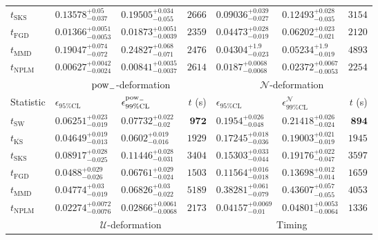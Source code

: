 \begin{tabular}{l|llr|llr}
	$t_{\mathrm{SKS}}$ & $0.13578_{-0.037}^{+0.05}$ & $0.19505_{-0.055}^{+0.034}$ & $2666$ & $0.09036_{-0.027}^{+0.039}$ & $0.12493_{-0.035}^{+0.028}$ & $3154$ \\
	$t_{\mathrm{FGD}}$ & ${\mathbf{0.01366_{-0.0053}^{+0.0051}}}$ & ${\mathbf{0.01873_{-0.0039}^{+0.0051}}}$ & $2359$ & $0.04473_{-0.019}^{+0.028}$ & $0.06202_{-0.021}^{+0.023}$ & $2120$ \\
	$t_{\mathrm{MMD}}$ & $0.19047_{-0.072}^{+0.074}$ & $0.24827_{-0.071}^{+0.068}$ & $2476$ & ${\mathbf{0.04304_{-0.023}^{+1.9}}}$ & ${\mathbf{0.05234_{-0.019}^{+1.9}}}$ & $4893$ \\
\rowcolor{red!35}	$t_{\mathrm{NPLM}}$ & $0.00627_{-0.0024}^{+0.0042}$ & $0.00841_{-0.0037}^{+0.0035}$ & $2614$ & $0.0187_{-0.0068}^{+0.0068}$ & $0.02372_{-0.0053}^{+0.0067}$ & $2254$ \\
	\toprule
	\multicolumn{1}{c}{} & \multicolumn{3}{c}{$\rm{pow}_{-}$-deformation} & \multicolumn{3}{c}{$\mathcal{N}$-deformation} \\
	Statistic & $\epsilon_{95\%\mathrm{CL}}$ & $\epsilon^  {\rm{pow}_{-}}_{99\%\mathrm{CL}}$ & $t$ (s) & $\epsilon_{95\%\mathrm{CL}}$ & $\epsilon^    {\mathcal{N}}_{99\%\mathrm{CL}}$ & $t$ (s) \\
	\midrule
	$t_{\mathrm{SW}}$ & $0.06251_{-0.019}^{+0.023}$ & $0.07732_{-0.02}^{+0.022}$ & ${\mathbf{972}}$ & $0.1954_{-0.048}^{+0.026}$ & $0.21418_{-0.024}^{+0.026}$ & ${\mathbf{894}}$ \\
	$t_{\overline{\mathrm{KS}}}$ & ${\mathbf{0.04649_{-0.013}^{+0.019}}}$ & ${\mathbf{0.0602_{-0.016}^{+0.019}}}$ & $1929$ & $0.17245_{-0.036}^{+0.018}$ & $0.19003_{-0.019}^{+0.021}$ & $1945$ \\
	$t_{\mathrm{SKS}}$ & $0.08917_{-0.025}^{+0.028}$ & $0.11446_{-0.031}^{+0.028}$ & $3404$ & $0.15303_{-0.044}^{+0.033}$ & $0.19176_{-0.047}^{+0.022}$ & $3597$ \\
	$t_{\mathrm{FGD}}$ & $0.0488_{-0.026}^{+0.029}$ & $0.06761_{-0.024}^{+0.029}$ & $1503$ & ${\mathbf{0.11564_{-0.018}^{+0.016}}}$ & ${\mathbf{0.13698_{-0.014}^{+0.012}}}$ & $1659$ \\
	$t_{\mathrm{MMD}}$ & $0.04774_{-0.019}^{+0.03}$ & $0.06826_{-0.022}^{+0.03}$ & $5189$ & $0.38281_{-0.079}^{+0.061}$ & $0.43607_{-0.055}^{+0.057}$ & $4053$ \\
\rowcolor{red!35}	$t_{\mathrm{NPLM}}$ & $0.02274_{-0.0076}^{+0.0072}$ & $0.02866_{-0.0068}^{+0.0061}$ & $2173$ & $0.04157_{-0.01}^{+0.0069}$ & $0.04801_{-0.0064}^{+0.0053}$ & $1336$ \\
	\toprule
	\multicolumn{1}{c}{} & \multicolumn{3}{c}{$\mathcal{U}$-deformation} & \multicolumn{3}{c}{Timing} \\

\end{tabular}
